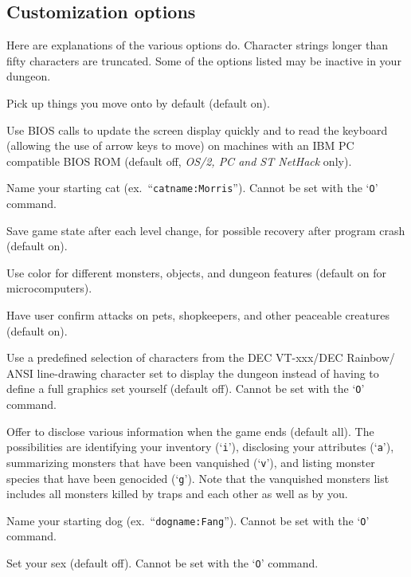 \subsection*{Customization options}

Here are explanations of the various options do.  Character strings
longer than fifty characters are truncated.  Some of the options
listed may be inactive in your dungeon.

\blist{}
\item[\ib{autopickup}]
Pick up things you move onto by default (default on).
\item[\ib{BIOS}]
Use BIOS calls to update the screen display quickly and to read the keyboard
(allowing the use of arrow keys to move) on machines with an IBM PC
compatible BIOS ROM (default off, {\it OS/2, PC\/ {\rm and} ST NetHack\/} only).
\item[\ib{catname}]
Name your starting cat (ex.\ ``{\tt catname:Morris}'').
Cannot be set with the `{\tt O}' command.
\item[\ib{checkpoint}]
Save game state after each level change, for possible recovery after
program crash (default on).
\item[\ib{color}]
Use color for different monsters, objects, and dungeon features
(default on for microcomputers).
\item[\ib{confirm}]
Have user confirm attacks on pets, shopkeepers, and other
peaceable creatures (default on).
\item[\ib{DECgraphics}]
Use a predefined selection of characters from the DEC VT-xxx/DEC Rainbow/
ANSI line-drawing character set to display the dungeon instead of having
to define a full graphics set yourself (default off).
Cannot be set with the `{\tt O}' command.
\item[\ib{disclose}]
Offer to disclose various information when the game ends (default all).
The possibilities are identifying your inventory (`{\tt i}'),
disclosing your attributes (`{\tt a}'), summarizing monsters that have been
vanquished (`{\tt v}'), and listing monster species that have been
genocided (`{\tt g}').
Note that the vanquished monsters list includes all monsters killed by
traps and each other as well as by you.
\item[\ib{dogname}]
Name your starting dog (ex.\ ``{\tt dogname:Fang}'').
Cannot be set with the `{\tt O}' command.
\item[\ib{female}]
Set your sex (default off). Cannot be set with the `{\tt O}' command.

